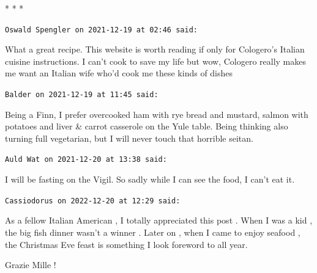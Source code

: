 
\begin{center}* * *\end{center}

\begin{footnotesize}
\begin{sffamily}
\texttt{Oswald Spengler on 2021-12-19 at 02:46 said:}

What a great recipe. This website is worth reading if only for Cologero's Italian cuisine instructions. I can't cook to save my life but wow, Cologero really makes me want an Italian wife who'd cook me these kinds of dishes

\hfill

\texttt{Balder on 2021-12-19 at 11:45 said:}

Being a Finn, I prefer overcooked ham with rye bread and mustard, salmon with potatoes and liver \& carrot casserole on the Yule table. Being thinking also turning full vegetarian, but I will never touch that horrible seitan.

\hfill

\texttt{Auld Wat on 2021-12-20 at 13:38 said:}

I will be fasting on the Vigil. So sadly while I can see the food, I can't eat it.

\hfill

\texttt{Cassiodorus on 2022-12-20 at 12:29 said:}

As a fellow Italian American , I totally appreciated this post . When I was a kid , the big fish dinner wasn't a winner . Later on , when I came to enjoy seafood , the Christmas Eve feast is something I look foreword to all year.

Grazie Mille !

\end{sffamily}
\end{footnotesize}

